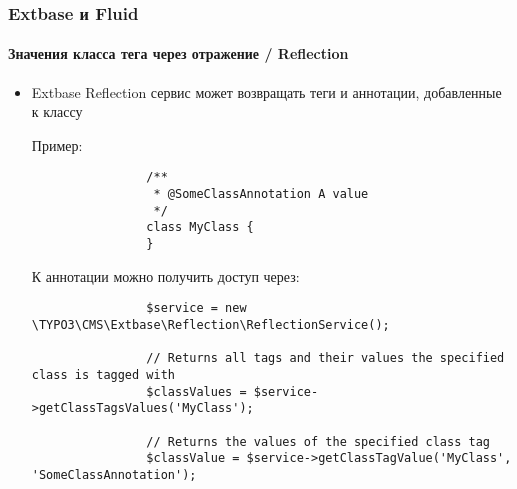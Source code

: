 \begin{frame}[fragile]
	\frametitle{Extbase и Fluid}
	\framesubtitle{Значения класса тега через отражение / Reflection}

	\lstset{
		basicstyle=\tiny\ttfamily
	}

	\begin{itemize}
		\item Extbase Reflection сервис может возвращать теги и аннотации, добавленные к классу\newline

			Пример:
			\begin{lstlisting}
				/**
				 * @SomeClassAnnotation A value
				 */
				class MyClass {
				}
			\end{lstlisting}

			К аннотации можно получить доступ через:
			\begin{lstlisting}
				$service = new \TYPO3\CMS\Extbase\Reflection\ReflectionService();

				// Returns all tags and their values the specified class is tagged with
				$classValues = $service->getClassTagsValues('MyClass');

				// Returns the values of the specified class tag
				$classValue = $service->getClassTagValue('MyClass', 'SomeClassAnnotation');
			\end{lstlisting}

	\end{itemize}

\end{frame}

